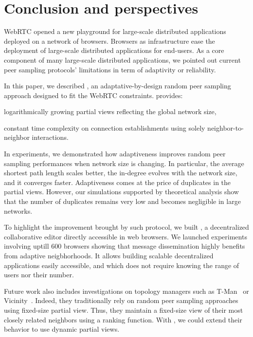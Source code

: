 
\section{Conclusion and perspectives}
\label{sec:conclusion}


WebRTC opened a new playground for large-scale distributed applications
deployed on a network of browsers. Browsers as infrastructure ease the
deployment of large-scale distributed applications for end-users. As a core
component of many large-scale distributed applications, we pointed out current
peer sampling protocols' limitations in term of adaptivity or reliability.

In this paper, we described \SPRAY, an adaptative-by-design random peer
sampling approach designed to fit the WebRTC constraints.  \SPRAY provides:
\begin{inparaenum}[(i)]
\item logarithmically growing partial views reflecting the global network size,
\item constant time complexity on connection establishments using solely
  neighbor-to-neighbor interactions.
\end{inparaenum}
In experiments, we demonstrated how \SPRAY adaptiveness improves random peer
sampling performances when network size is changing. In particular, the average
shortest path length scales better, the in-degree evolves with the network size,
and it converges faster.  Adaptiveness comes at the price of duplicates in the
partial views. However, our simulations supported by theoretical analysis show
that the number of duplicates remains very low and becomes negligible in large
networks.

To highlight the improvement brought by such protocol, we built \CRATE, a
decentralized collaborative editor directly accessible in web browsers. We
launched experiments involving uptill 600 browsers showing that message
dissemination highly benefits from adaptive neigbhorhoods. It allows building
scalable decentralized applications easily accessible, and which does not
require knowing the range of users nor their number.

Future work also includes investigations on topology managers such as
T-Man~\cite{jelasity2009tman} or Vicinity~\cite{voulgaris2005epidemic}. Indeed,
they traditionally rely on random peer sampling approaches using fixed-size
partial view. Thus, they maintain a fixed-size view of their most closely
related neighbors using a ranking function. With \SPRAY, we could extend their
behavior to use dynamic partial views.


